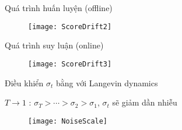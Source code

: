 

\begin{frame}{Quá trình huấn luyện (offline)}
	\begin{figure}
		\texttt{[image: ScoreDrift2]}
	\end{figure}
\end{frame}
\begin{frame}{Quá trình suy luận (online)}
	\begin{figure}
		\texttt{[image: ScoreDrift3]}
	\end{figure}
\end{frame}


\begin{frame}{Điều khiển $\sigma_t$ bằng với Langevin dynamics}
	

	
	$T \rightarrow 1$ :  $\sigma_T > \cdots  >  \sigma_2 > \sigma_1$, $\sigma_t$ sẽ giảm dần nhiễu
		
	\begin{figure}
		\centering
		\texttt{[image: NoiseScale]}
	\end{figure}
\end{frame}

